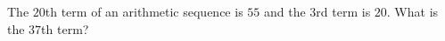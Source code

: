 The $20$th term of an arithmetic sequence is $55$ and the $3$rd term is $20$. What is the $37$th term?

